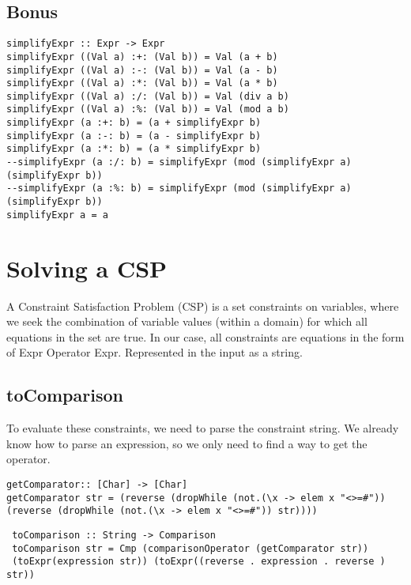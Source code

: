 \documentclass[a4paper,11pt]{article}
\begin{document}
\subsection{Bonus}
\begin{lstlisting}
simplifyExpr :: Expr -> Expr
simplifyExpr ((Val a) :+: (Val b)) = Val (a + b)
simplifyExpr ((Val a) :-: (Val b)) = Val (a - b)
simplifyExpr ((Val a) :*: (Val b)) = Val (a * b)
simplifyExpr ((Val a) :/: (Val b)) = Val (div a b)
simplifyExpr ((Val a) :%: (Val b)) = Val (mod a b)
simplifyExpr (a :+: b) = (a + simplifyExpr b)
simplifyExpr (a :-: b) = (a - simplifyExpr b)
simplifyExpr (a :*: b) = (a * simplifyExpr b)
--simplifyExpr (a :/: b) = simplifyExpr (mod (simplifyExpr a) (simplifyExpr b))
--simplifyExpr (a :%: b) = simplifyExpr (mod (simplifyExpr a) (simplifyExpr b))
simplifyExpr a = a

\end{lstlisting}

\section{Solving a CSP}
 
 A Constraint Satisfaction Problem (CSP) is a set constraints on variables,  
 where we seek the combination of variable values (within a domain) for 
 which all equations in the set are true. In our case, all constraints are 
 equations in the form of Expr Operator Expr. Represented in the input as a 
 string. 
 
 \subsection{toComparison}
 
 To evaluate these constraints, we need to parse the constraint string. We 
 already know how to parse an expression, so we only need to find a way to 
 get the operator.
 \begin{lstlisting}
getComparator:: [Char] -> [Char]
getComparator str = (reverse (dropWhile (not.(\x -> elem x "<>=#")) (reverse (dropWhile (not.(\x -> elem x "<>=#")) str))))
 \end{lstlisting}
 
 \begin{lstlisting}
 toComparison :: String -> Comparison
 toComparison str = Cmp (comparisonOperator (getComparator str)) 
 (toExpr(expression str)) (toExpr((reverse . expression . reverse ) str))
 \end{lstlisting}
 
\end{document}
